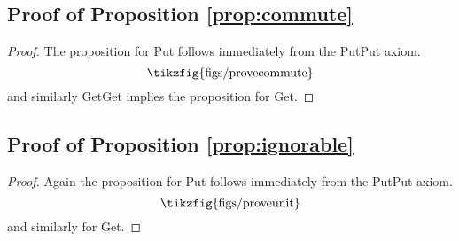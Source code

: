 \documentclass[submission,copyright,creativecommons,sharealike,noncommercial]{eptcs}
\newcommand{\tikzfigscale}[2]{\scalebox{#1}{\tikzfig{#2}}}
\theoremstyle{definition}
\theoremstyle{plain}
\theoremstyle{plain}
\begin{document}
\subsection{Proof of Proposition \ref{prop:commute}}\label{proof:commute}
\begin{proof}
The proposition for Put follows immediately from the PutPut axiom.
\begin{equation}
    \tikzfigscale{1}{figs/provecommute}
\end{equation}
and similarly GetGet implies the proposition for Get.
\end{proof}


\subsection{Proof of Proposition \ref{prop:ignorable}}\label{proof:ignorable}
\begin{proof}
Again the proposition for Put follows immediately from the PutPut axiom.
\begin{equation}
    \tikzfigscale{1}{figs/proveunit}
\end{equation}
and similarly for Get.
\end{proof}
\end{document}
